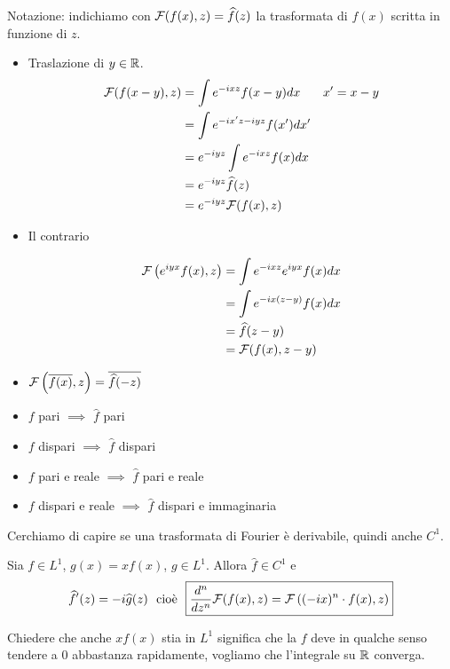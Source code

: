 Notazione: indichiamo con $\mathcal{F}(f(x), z) = \widehat{f}(z)$ la trasformata di $f(x)$ scritta in funzione di $z$.
\begin{itemize}
\item Traslazione di $y\in \mathbb{R}$.
\begin{align*}
\mathcal{F}(f(x - y), z) & = \int e^{- ixz} f(x - y) dx & x' = x - y\\
 & = \int e^{- ix'z - iyz} f(x') dx' & \\
 & = e^{- iyz}\int e^{- ixz} f(x) dx & \\
 & = e^{- iyz}\widehat{f}(z) & \\
 & = e^{- iyz}\mathcal{F}(f(x), z) &
\end{align*}
\item Il contrario

\begin{align*}
\mathcal{F}\left(e^{iyx} f(x), z\right) & = \int e^{- ixz} e^{iyx} f(x) dx\\
 & = \int e^{- ix(z - y)} f(x) dx\\
 & = \widehat{f}(z - y)\\
 & = \mathcal{F}(f(x), z - y)
\end{align*}
\item $\mathcal{F}\left(\overline{f(x)}, z\right) = \overline{\widehat{f}(- z)}$
\item $f$ pari $\implies $ $\hat{f}$ pari
\item $f$ dispari $\implies $ $\hat{f}$ dispari
\item $f$ pari e reale $\implies $ $\hat{f}$ pari e reale
\item $f$ dispari e reale $\implies $ $\hat{f}$ dispari e immaginaria
\end{itemize}

Cerchiamo di capire se una trasformata di Fourier è derivabile, quindi anche $C^{1}$.
\begin{thm}
Sia $f\in L^{1}$, $g(x) = xf(x)$, $g\in L^{1}$. Allora $\hat{f} \in C^{1}$ e
\begin{equation*}
\hat{f}'(z) = - i\hat{g}(z) \ \ \text{cioè} \ \ \boxed{\frac{d^{n}}{dz^{n}}\Fc(f(x), z) = \Fc\left((- ix)^{n} \cdot f(x), z\right)}
\end{equation*}
\end{thm}
Chiedere che anche $xf(x)$ stia in $L^{1}$ significa che la $f$ deve in qualche senso tendere a $0$ abbastanza rapidamente, vogliamo che l'integrale su $\mathbb{R}$ converga.

